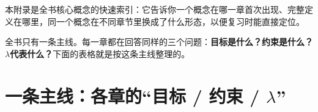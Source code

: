 
本附录是全书核心概念的快速索引：它告诉你一个概念在哪一章首次出现、完整定义在哪里，同一个概念在不同章节里换成了什么形态，以便复习时能直接定位。

全书只有一条主线。每一章都在回答同样的三个问题：\textbf{目标是什么？约束是什么？$\lambda$代表什么？}下面的表格就是按这条主线整理的。

\section*{一条主线：各章的“目标 / 约束 / $\lambda$”}

